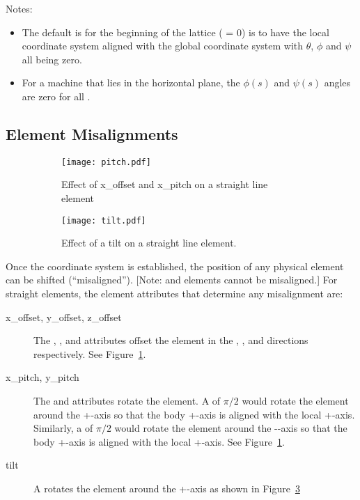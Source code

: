 \documentclass{hitec}     %
\begin{document}
{Notes:
\vspace{-5 pt}
\begin{itemize}
\item 
The default is for the beginning of the lattice ( = 0) is to have the local 
coordinate system aligned with the global  coordinate system with $\theta$, $\phi$ and
$\psi$ all being zero.
\item 
For a machine that lies in the horizontal plane, the $\phi(s)$ and $\psi(s)$ angles are zero for all
.
\end{itemize}

\newpage

\subsection{Element Misalignments}
\label{s:ele.mis}

\begin{figure}[tb]
  \centering
  \begin{subfigure}[t]{0.62\textwidth}
    \texttt{[image: pitch.pdf]}
    \caption{Effect of x_offset and x_pitch on a straight line element}
    \label{f:pitch}
  \end{subfigure}
  \hfil
  \begin{subfigure}[t]{0.33\textwidth}
    \texttt{[image: tilt.pdf]}
    \caption{Effect of a tilt on a straight line element.}
    \label{f:tilt}
  \end{subfigure}
  \caption{}
\end{figure}

Once the  coordinate system is established, the position of any physical element
can be shifted (``misaligned''). [Note:  and  elements cannot be misaligned.]
For straight elements, the element attributes that determine any misalignment are:
\begin{description}
\item[x_offset, y_offset, z_offset] \Newline
The , , and  attributes offset the element in the , ,
and  directions respectively. See Figure~\ref{f:pitch}.
%
\item[x_pitch, y_pitch] \Newline
The  and  attributes rotate the element. A  of $\pi/2$ would rotate the
element around the +-axis so that the body +-axis is aligned with the local
+-axis. Similarly, a  of $\pi/2$ would rotate the element around the --axis so
that the body +-axis is aligned with the local +-axis. See Figure~\ref{f:pitch}.
%
\item[tilt] \Newline
A  rotates the element around the +-axis as shown in Figure~\ref{f:tilt}
\end{description}

}
\end{document}
